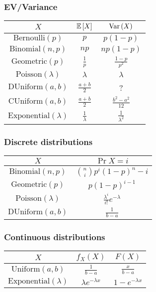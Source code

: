 \subsubsection{EV/Variance}
\begin{center}
    \begin{tabular}{|c|c|c|}
        \hline 
        $X$ & $\mathbb{E}\left[ X \right]$ & $\text{Var}\left( X \right)$ \\
        \hline
        $\text{Bernoulli}(p)$ & $p$ & $p(1-p)$ \\
        \hline
        $\text{Binomial}(n,p)$ & $np$ & $np(1-p)$ \\
        \hline
        $\text{Geometric}(p)$ & $\frac{1}{p}$ & $\frac{1-p}{p^2}$ \\
        \hline
        $\text{Poisson}(\lambda)$ & $\lambda$ & $\lambda$ \\
        \hline
        $\text{DUniform}(a,b)$ & $\frac{a+b}{2}$ & ? \\
        \hline
        $\text{CUniform}(a,b)$ & $\frac{a+b}{2}$ & $\frac{b^2-a^2}{12}$ \\
        \hline
        $\text{Exponential}(\lambda)$ & $\frac{1}{\lambda}$ & $\frac{1}{\lambda^2}$ \\
        \hline
    \end{tabular}
\end{center}

\subsubsection{Discrete distributions}
\begin{center}
    \begin{tabular}{|c|c|}
        \hline 
        $X$ & $\Pr{X = i}$ \\
        \hline
        $\text{Binomial}(n,p)$ & $\binom{n}{i} p^i (1-p)^n-i$ \\
        \hline
        $\text{Geometric}(p)$ & $p(1-p)^{i-1}$ \\
        \hline
        $\text{Poisson}(\lambda)$ & $\frac{\lambda^i}{i!}e^{-\lambda}$ \\
        \hline
        $\text{DUniform}(a,b)$ & $\frac{1}{b-a}$ \\
        \hline
    \end{tabular}
\end{center}

\subsubsection{Continuous distributions}
\begin{center}
    \begin{tabular}{|c|c|c|}
        \hline
        $X$ & $f_X(X)$ & $F(X)$ \\
        \hline 
        $\text{Uniform}(a,b)$ & $\frac{1}{b-a}$ & $\frac{x}{b-a}$ \\
        \hline
        $\text{Exponential}(\lambda)$ & $\lambda e^{-\lambda x}$ & $1 - e^{-\lambda x}$ \\
        \hline
    \end{tabular}
\end{center}